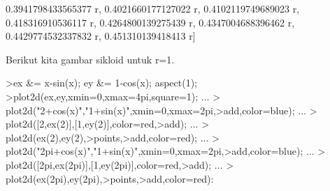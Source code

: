 \documentclass[a4paper,10pt]{article}
\begin{document}
\begin{eulernotebook}
\begin{eulercomment}
\begin{eulercomment}
\begin{eulercomment}
\begin{eulercomment}
\begin{eulercomment}
\begin{eulercomment}
\begin{eulercomment}
\begin{eulercomment}
\begin{eulercomment}
\begin{eulercomment}
\begin{eulercomment}
\begin{eulercomment}
\begin{eulercomment}
\begin{eulercomment}
\begin{eulercomment}
\begin{eulercomment}
\begin{eulercomment}
\begin{eulercomment}
\begin{eulercomment}
\begin{eulercomment}
\begin{eulercomment}
\begin{eulercomment}
\begin{eulercomment}
\begin{eulercomment}
\begin{eulercomment}
\begin{eulercomment}
\begin{eulercomment}
\begin{eulercomment}
\begin{euleroutput}
  0.3941798433565377 r, 0.4021660177127022 r, 0.4102119749689023 r, 
  0.418316910536117 r, 0.4264800139275439 r, 0.4347004688396462 r, 
  0.4429774532337832 r, 0.451310139418413 r]
  
\end{euleroutput}
\begin{eulercomment}
Berikut kita gambar sikloid untuk r=1.
\end{eulercomment}
\begin{eulerprompt}
>ex &= x-sin(x); ey &= 1-cos(x); aspect(1);
>plot2d(ex,ey,xmin=0,xmax=4pi,square=1); ...
>  plot2d("2+cos(x)","1+sin(x)",xmin=0,xmax=2pi,>add,color=blue); ...
>  plot2d([2,ex(2)],[1,ey(2)],color=red,>add); ...
>  plot2d(ex(2),ey(2),>points,>add,color=red); ...
>  plot2d("2pi+cos(x)","1+sin(x)",xmin=0,xmax=2pi,>add,color=blue); ...
>  plot2d([2pi,ex(2pi)],[1,ey(2pi)],color=red,>add);  ...
>  plot2d(ex(2pi),ey(2pi),>points,>add,color=red):
\end{eulerprompt}
\begin{euleroutput}

\end{euleroutput}
\end{eulercomment}
\end{eulercomment}
\end{eulercomment}
\end{eulercomment}
\end{eulercomment}
\end{eulercomment}
\end{eulercomment}
\end{eulercomment}
\end{eulercomment}
\end{eulercomment}
\end{eulercomment}
\end{eulercomment}
\end{eulercomment}
\end{eulercomment}
\end{eulercomment}
\end{eulercomment}
\end{eulercomment}
\end{eulercomment}
\end{eulercomment}
\end{eulercomment}
\end{eulercomment}
\end{eulercomment}
\end{eulercomment}
\end{eulercomment}
\end{eulercomment}
\end{eulercomment}
\end{eulercomment}
\end{eulercomment}
\end{eulernotebook}
\end{document}
